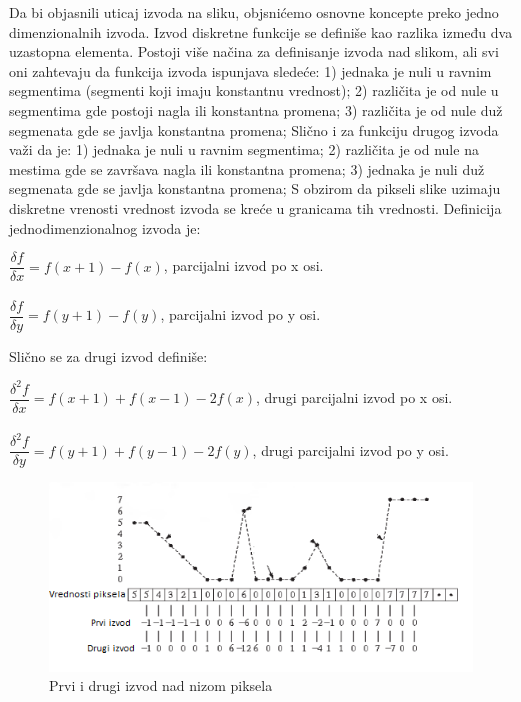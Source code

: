 \documentclass[a4paper,12pt,titlepage]{article}
\begin{document}
Da bi objasnili uticaj izvoda na sliku, objsnićemo osnovne koncepte preko jedno dimenzionalnih izvoda. Izvod diskretne funkcije se definiše kao razlika između dva uzastopna elementa. Postoji više načina za definisanje izvoda nad slikom, ali svi oni zahtevaju da funkcija izvoda ispunjava sledeće: 1) jednaka je nuli u ravnim segmentima (segmenti koji imaju konstantnu vrednost); 2) različita je od nule u segmentima gde postoji nagla ili konstantna promena; 3) različita je od nule duž segmenata gde se javlja konstantna promena; Slično i za funkciju drugog izvoda važi da je: 1)  jednaka je nuli u ravnim segmentima; 2) različita je od nule na mestima gde se završava nagla ili konstantna promena; 3) jednaka je nuli duž segmenata gde se javlja konstantna promena; S obzirom da pikseli slike uzimaju diskretne vrenosti vrednost izvoda se kreće u granicama tih vrednosti. Definicija jednodimenzionalnog izvoda je: 

\begin{center}
$\dfrac{\delta f}{\delta x} = f(x + 1) - f(x)$, parcijalni izvod po x osi.\\
\emph{} \\
$\dfrac{\delta f}{\delta y} = f(y + 1) - f(y)$, parcijalni izvod po y osi.\\
\end{center}

Slično se za drugi izvod definiše:

\begin{center}
$\dfrac{\delta^2 f}{\delta x} = f(x + 1) + f(x - 1) - 2f(x)$, drugi parcijalni izvod po x osi.\\
\emph{} \\
$\dfrac{\delta^2 f}{\delta y} = f(y + 1) + f(y - 1) - 2f(y)$, drugi parcijalni izvod po y osi.\\
\end{center}

\begin{figure}[ht!]
\centering
\includegraphics[width=120mm]{img/izvod.png}
\caption{Prvi i drugi izvod nad nizom piksela}
\label{overflow}
\end{figure}
\end{document}
